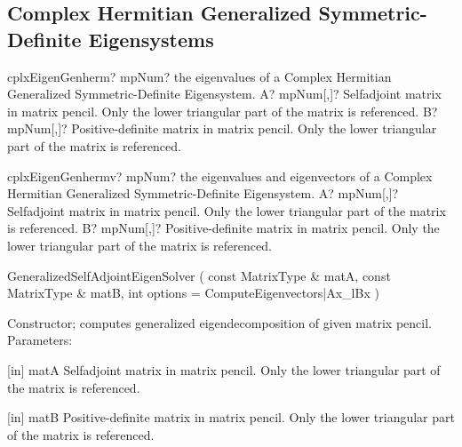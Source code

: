 \subsection{Complex Hermitian Generalized Symmetric-Definite Eigensystems}


\begin{mpFunctionsExtract}
	\mpFunctionTwo
	{cplxEigenGenherm? mpNum? the eigenvalues of a Complex Hermitian Generalized Symmetric-Definite Eigensystem.}
	{A? mpNum[,]? Selfadjoint matrix in matrix pencil. Only the lower triangular part of the matrix is referenced.}
	{B? mpNum[,]? Positive-definite matrix in matrix pencil. Only the lower triangular part of the matrix is referenced.}
\end{mpFunctionsExtract}

\vspace{0.6cm}
\begin{mpFunctionsExtract}
	\mpFunctionTwo
	{cplxEigenGenhermv? mpNum? the eigenvalues and eigenvectors of a Complex Hermitian Generalized Symmetric-Definite Eigensystem.}
	{A? mpNum[,]? Selfadjoint matrix in matrix pencil. Only the lower triangular part of the matrix is referenced.}
	{B? mpNum[,]? Positive-definite matrix in matrix pencil. Only the lower triangular part of the matrix is referenced.}
\end{mpFunctionsExtract}

%

\vspace{0.3cm}
GeneralizedSelfAdjointEigenSolver  ( const MatrixType \&  matA,    const MatrixType \&  matB,    int  options = ComputeEigenvectors|Ax\_lBx )   

Constructor; computes generalized eigendecomposition of given matrix pencil. 
Parameters:

[in] matA Selfadjoint matrix in matrix pencil. Only the lower triangular part of the matrix is referenced.  

[in] matB Positive-definite matrix in matrix pencil. Only the lower triangular part of the matrix is referenced.  

